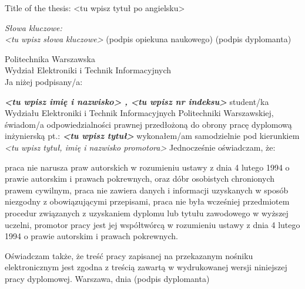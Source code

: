 \newpage
\thispagestyle{empty}
\phantom{Nothing here}
\newpage
\clearpage
\phantom{Here neither}

\setcounter{page}{5}
\vspace{-1.5cm}
\begin{flushleft}
	Title of the thesis: <tu wpisz tytuł po angielsku> 
\end{flushleft}
\vspace{0.5cm}
\vspace{0.5cm}
\noindent \textit{Słowa kluczowe: \\ <tu wpisz słowa kluczowe>} 
\vfill
(podpis opiekuna naukowego) \hfill (podpis dyplomanta)

\newpage
\thispagestyle{empty}
\phantom{Nothing here}
\newpage
\clearpage
\phantom{Here neither}

\setcounter{page}{7}
\vspace{-1.5cm}
\begin{flushleft}
	Politechnika Warszawska \\ 
	Wydział Elektroniki i Technik Informacyjnych \\
	\vspace{0.5cm}
	Ja niżej podpisany/a: 
\end{flushleft}
\center \textit{\textbf{<tu wpisz imię i nazwisko> , <tu wpisz nr indeksu>}} 
\justify student/ka Wydziału Elektroniki i Technik Informacyjnych Politechniki Warszawskiej, świadom/a odpowiedzialności prawnej przedłożoną do obrony pracę dyplomową inżynierską pt.:
\center \textit{\textbf{<tu wpisz tytuł> }} 
\justify wykonałem/am samodzielnie pod kierunkiem
\center \textit{<tu wpisz tytuł, imię i nazwisko promotora> } 
\justify Jednocześnie oświadczam, że: \\
\begin{itemize}
	\itemi praca nie narusza praw autorskich w rozumieniu ustawy z dnia 4 lutego 1994 o prawie autorskim i prawach pokrewnych, oraz dóbr osobistych chronionych prawem cywilnym,
	\itemi praca nie zawiera danych i informacji uzyskanych w sposób niezgodny z obowiązującymi przepisami,
	\itemi praca nie była wcześniej przedmiotem procedur związanych z uzyskaniem dyplomu lub tytułu zawodowego w wyższej uczelni,
	\itemi promotor pracy jest jej współtwórcą w rozumieniu ustawy z dnia 4 lutego 1994 o prawie autorskim i prawach pokrewnych.
\end{itemize}
\justify Oświadczam także, że treść pracy zapisanej na przekazanym nośniku elektronicznym jest zgodna z treścią zawartą w wydrukowanej wersji niniejszej pracy dyplomowej.
\vfill
Warszawa, dnia  \hfill (podpis dyplomanta) 

